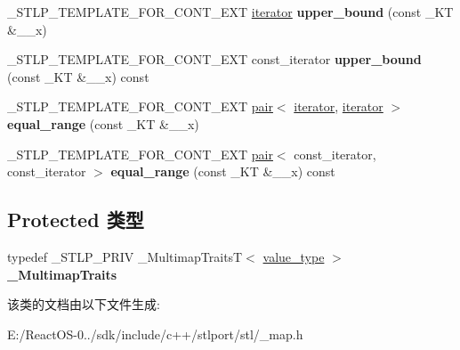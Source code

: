 \begin{DoxyCompactItemize}
\+\_\+\+S\+T\+L\+P\+\_\+\+T\+E\+M\+P\+L\+A\+T\+E\+\_\+\+F\+O\+R\+\_\+\+C\+O\+N\+T\+\_\+\+E\+XT \hyperlink{structiterator}{iterator} {\bfseries upper\+\_\+bound} (const \+\_\+\+KT \&\+\_\+\+\_\+x)
\item 
\mbox{\label{classmultimap_a3bfc70d9f76fd944ecb9841eb30a68a8}} 
\+\_\+\+S\+T\+L\+P\+\_\+\+T\+E\+M\+P\+L\+A\+T\+E\+\_\+\+F\+O\+R\+\_\+\+C\+O\+N\+T\+\_\+\+E\+XT const\+\_\+iterator {\bfseries upper\+\_\+bound} (const \+\_\+\+KT \&\+\_\+\+\_\+x) const
\item 
\mbox{\label{classmultimap_addea0569d1fef1ab575bd4cd8d414803}} 
\+\_\+\+S\+T\+L\+P\+\_\+\+T\+E\+M\+P\+L\+A\+T\+E\+\_\+\+F\+O\+R\+\_\+\+C\+O\+N\+T\+\_\+\+E\+XT \hyperlink{structpair}{pair}$<$ \hyperlink{structiterator}{iterator}, \hyperlink{structiterator}{iterator} $>$ {\bfseries equal\+\_\+range} (const \+\_\+\+KT \&\+\_\+\+\_\+x)
\item 
\mbox{\label{classmultimap_a5a9909dcfd444f057ebe01dcb636313a}} 
\+\_\+\+S\+T\+L\+P\+\_\+\+T\+E\+M\+P\+L\+A\+T\+E\+\_\+\+F\+O\+R\+\_\+\+C\+O\+N\+T\+\_\+\+E\+XT \hyperlink{structpair}{pair}$<$ const\+\_\+iterator, const\+\_\+iterator $>$ {\bfseries equal\+\_\+range} (const \+\_\+\+KT \&\+\_\+\+\_\+x) const
\end{DoxyCompactItemize}
\subsection*{Protected 类型}
\begin{DoxyCompactItemize}
\item 
\mbox{\label{classmultimap_a7a7e64492c02817a722c7c188fd3069e}} 
typedef \+\_\+\+S\+T\+L\+P\+\_\+\+P\+R\+IV \+\_\+\+Multimap\+TraitsT$<$ \hyperlink{structpair}{value\+\_\+type} $>$ {\bfseries \+\_\+\+Multimap\+Traits}
\end{DoxyCompactItemize}


该类的文档由以下文件生成\+:\begin{DoxyCompactItemize}
\item 
E\+:/\+React\+O\+S-\/0../sdk/include/c++/stlport/stl/\+\_\+map.\+h\end{DoxyCompactItemize}
